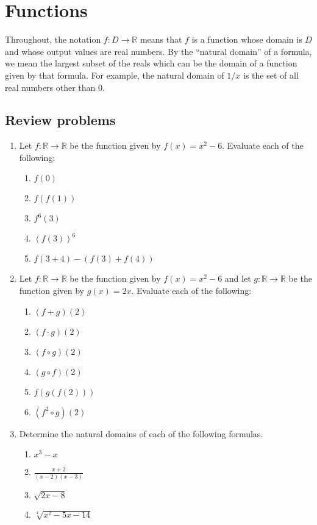 \section{Functions}

Throughout, the notation $f:D\to\mathbb{R}$ means that $f$ is a function whose domain is $D$ and whose output values are real numbers. By the ``natural domain'' of a formula, we mean the largest subset of the reals which can be the domain of a function given by that formula. For example, the natural domain of $1/x$ is the set of all real numbers other than $0$.

\subsection{Review problems}

\begin{enumerate}
\item Let $f:\mathbb{R}\to\mathbb{R}$ be the function given by $f(x) = x^2 - 6$. Evaluate each of the following:
\begin{enumerate}
\item $f(0)$
\item $f(f(1))$
\item $f^{6}(3)$
\item $(f(3))^6$
\item $f(3 + 4) - (f(3) + f(4))$
\end{enumerate}
\item Let $f:\mathbb{R}\to\mathbb{R}$ be the function given by $f(x) = x^2 - 6$ and let $g:\mathbb{R}\to\mathbb{R}$ be the function given by $g(x) = 2x$. Evaluate each of the following:
\begin{enumerate}
\item $(f + g)(2)$
\item $(f\cdot g)(2)$
\item $(f\circ g)(2)$
\item $(g\circ f)(2)$
\item $f(g(f(2)))$
\item $(f^2\circ g)(2)$
\end{enumerate}
\item Determine the natural domains of each of the following formulas.
\begin{enumerate}
\item $x^3 - x$
\item $\tfrac{x + 2}{(x - 2)(x - 3)}$
\item $\sqrt{2x - 8}$
\item $\sqrt[4]{x^2 - 5x - 14}$

\end{enumerate}
\end{enumerate}
